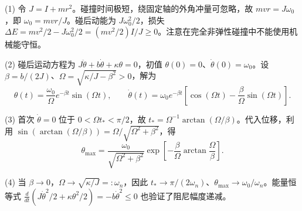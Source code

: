 (1) 令 \(J=I+mr^2\)。碰撞时间极短，绕固定轴的外角冲量可忽略，故 \(mvr=J\omega_0\)，即 \(\omega_0=mvr/J\)。碰后动能为 \(J\omega_0^2/2\)，损失 \(\Delta E=mv^2/2-J\omega_0^2/2=(mv^2/2)I/J\ge0\)。注意在完全非弹性碰撞中不能使用机械能守恒。

(2) 碰后运动方程为 \(J\ddot\theta+b\dot\theta+\kappa\theta=0\)，初值 \(\theta(0)=0\)、\(\dot\theta(0)=\omega_0\)。设 \(\beta=b/(2J)\)、\(\Omega=\sqrt{\kappa/J-\beta^2}>0\)，解为
\[\theta(t)=\frac{\omega_0}{\Omega}e^{-\beta t}\sin(\Omega t),\qquad
\dot\theta(t)=\omega_0 e^{-\beta t}\!\left[\cos(\Omega t)-\frac{\beta}{\Omega}\sin(\Omega t)\right].\]

(3) 首次 \(\dot\theta=0\) 位于 \(0<\Omega t_*<\pi/2\)，故 \(t_*=\Omega^{-1}\arctan(\Omega/\beta)\)。代入位移，利用 \(\sin(\arctan(\Omega/\beta))=\Omega/\sqrt{\Omega^2+\beta^2}\)，得
\[\theta_{\max}=\frac{\omega_0}{\sqrt{\Omega^2+\beta^2}}\exp\!\left[-\frac{\beta}{\Omega}\arctan\frac{\Omega}{\beta}\right].\]

(4) 当 \(\beta\to0\)，\(\Omega\to\sqrt{\kappa/J}=:\omega_n\)，因此 \(t_*\to\pi/(2\omega_n)\)、\(\theta_{\max}\to\omega_0/\omega_n\)。能量恒等式 \(\frac{d}{dt}(J\dot\theta^2/2+\kappa\theta^2/2)=-b\dot\theta^2\le0\) 也验证了阻尼幅度递减。
